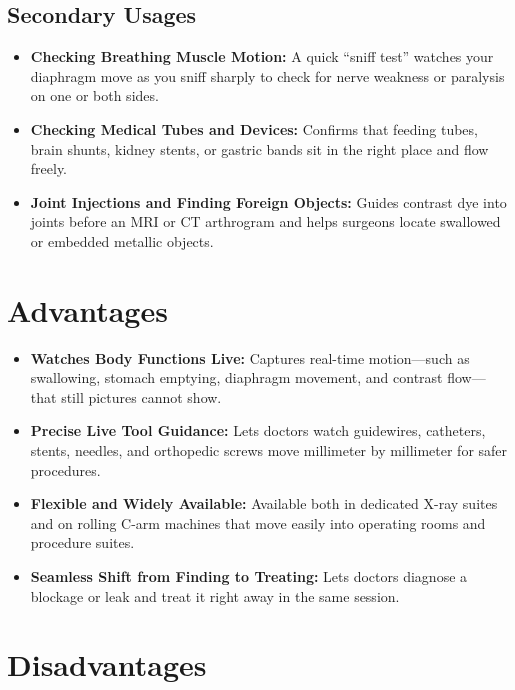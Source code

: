 \subsection{Secondary Usages}

\begin{itemize}
    \item \textbf{Checking Breathing Muscle Motion:} A quick ``sniff test'' watches your diaphragm move as you sniff sharply to check for nerve weakness or paralysis on one or both sides.
    \item \textbf{Checking Medical Tubes and Devices:} Confirms that feeding tubes, brain shunts, kidney stents, or gastric bands sit in the right place and flow freely.
    \item \textbf{Joint Injections and Finding Foreign Objects:} Guides contrast dye into joints before an MRI or CT arthrogram and helps surgeons locate swallowed or embedded metallic objects.
\end{itemize}

\section{Advantages}

\begin{itemize}
    \item \textbf{Watches Body Functions Live:} Captures real-time motion---such as swallowing, stomach emptying, diaphragm movement, and contrast flow---that still pictures cannot show.
    \item \textbf{Precise Live Tool Guidance:} Lets doctors watch guidewires, catheters, stents, needles, and orthopedic screws move millimeter by millimeter for safer procedures.
    \item \textbf{Flexible and Widely Available:} Available both in dedicated X-ray suites and on rolling C-arm machines that move easily into operating rooms and procedure suites.
    \item \textbf{Seamless Shift from Finding to Treating:} Lets doctors diagnose a blockage or leak and treat it right away in the same session.
\end{itemize}

\section{Disadvantages}

